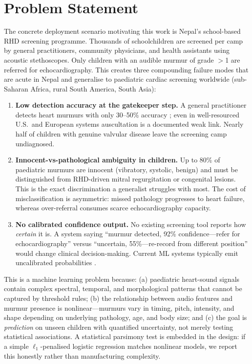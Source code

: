 \documentclass[10pt,twocolumn]{article}
\begin{document}
\section{Problem Statement}

The concrete deployment scenario motivating this work is Nepal's school-based RHD screening programme. Thousands of schoolchildren are screened per camp by general practitioners, community physicians, and health assistants using acoustic stethoscopes. Only children with an audible murmur of grade $>$1 are referred for echocardiography. This creates three compounding failure modes that are acute in Nepal and generalise to paediatric cardiac screening worldwide (sub-Saharan Africa, rural South America, South Asia):

\begin{enumerate}[label=(\alph*)]
    \item \textbf{Low detection accuracy at the gatekeeper step.} A general practitioner detects heart murmurs with only 30--50\% accuracy \citep{lam2015}; even in well-resourced U.S.\ and European systems auscultation is a documented weak link. Nearly half of children with genuine valvular disease leave the screening camp undiagnosed.
    \item \textbf{Innocent-vs-pathological ambiguity in children.} Up to 80\% of paediatric murmurs are innocent (vibratory, systolic, benign) and must be distinguished from RHD-driven mitral regurgitation or congenital lesions. This is the exact discrimination a generalist struggles with most. The cost of misclassification is asymmetric: missed pathology progresses to heart failure, whereas over-referral consumes scarce echocardiography capacity.
    \item \textbf{No calibrated confidence output.} No existing screening tool reports how \textit{certain} it is. A system saying ``murmur detected, 92\% confidence---refer for echocardiography'' versus ``uncertain, 55\%---re-record from different position'' would change clinical decision-making. Current ML systems typically emit uncalibrated probabilities \citep{guo2017}.
\end{enumerate}

This is a machine learning problem because: (a) paediatric heart-sound signals contain complex spectral, temporal, and morphological patterns that cannot be captured by threshold rules; (b) the relationship between audio features and murmur presence is nonlinear---murmurs vary in timing, pitch, intensity, and shape depending on underlying pathology, age, and body size; and (c) the goal is \textit{prediction} on unseen children with quantified uncertainty, not merely testing statistical associations. A statistical parsimony test is embedded in the design: if a simple $\ell_1$-penalised logistic regression matches nonlinear models, we report this honestly rather than manufacturing complexity.
\end{document}
